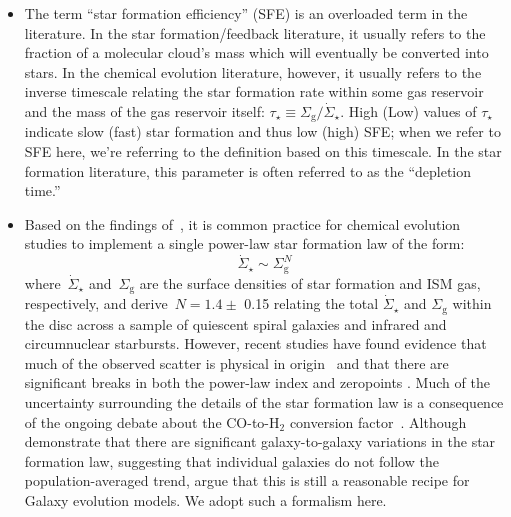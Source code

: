 \documentclass[fleqn, usenatbib]{mnras}
\begin{document}
\begin{itemize} 
	\item The term ``star formation efficiency'' (SFE) is an overloaded term in 
	the literature. In the star formation/feedback literature, it usually 
	refers to the fraction of a molecular cloud's mass which will eventually 
	be converted into stars. In the chemical evolution literature, however, it 
	usually refers to the inverse timescale relating the star formation rate 
	within some gas reservoir and the mass of the gas reservoir itself: 
	$\tau_\star \equiv \Sigma_\text{g}/\dot{\Sigma}_\star$. High (Low) 
	values of $\tau_\star$ indicate slow (fast) star formation and thus low 
	(high) SFE; when we refer to SFE here, we're referring to the definition 
	based on this timescale. In the star formation literature, this parameter 
	is often referred to as the ``depletion time.'' 

	\item Based on the findings of~\citet{Kennicutt1998}, it is common practice 
	for chemical evolution studies to implement a single power-law star 
	formation law of the form: 
	\begin{equation} 
	\dot{\Sigma}_\star \sim \Sigma_\text{g}^N 
	\end{equation} 
	where~$\dot{\Sigma}_\star$ and~$\Sigma_\text{g}$ are the surface 
	densities of star formation and ISM gas, respectively, and 
	\citet{Kennicutt1998} derive~$N = 1.4 \pm$ 0.15 relating the total 
	$\dot{\Sigma}_\star$ and $\Sigma_\text{g}$ within the disc across a 
	sample of quiescent spiral galaxies and infrared and circumnuclear 
	starbursts. However, recent studies have found evidence that much of the 
	observed scatter is physical in origin~\citep{delosReyes2019} and that 
	there are significant breaks in both the power-law index and zeropoints 
	\citep{Kennicutt2020}. Much of the uncertainty surrounding the details of 
	the star formation law is a consequence of the ongoing debate about the 
	CO-to-H$_2$ conversion factor~\citep{Kennicutt2012, Liu2015}. Although 
	\citet{Ellison2020a} demonstrate that there are significant 
	galaxy-to-galaxy variations in the star formation law, suggesting that 
	individual galaxies do not follow the population-averaged trend, 
	\citet{delosReyes2019} argue that this is still a reasonable recipe for 
	Galaxy evolution models. We adopt such a formalism here. 


\end{itemize}
\end{document}
